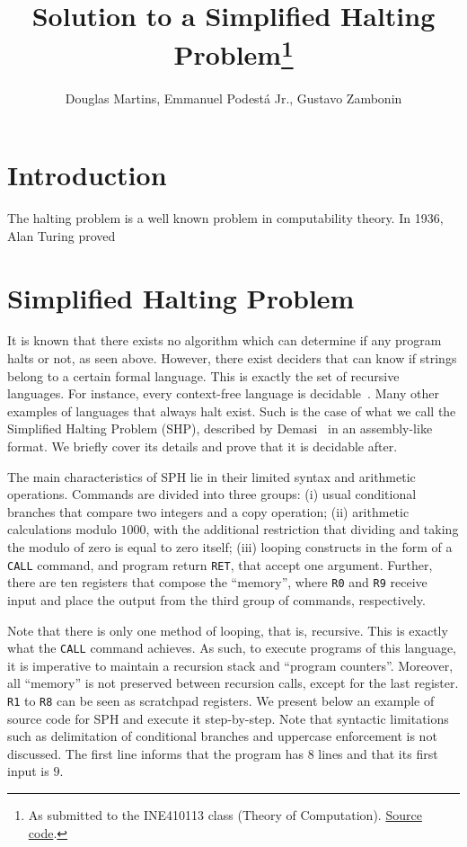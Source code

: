 \documentclass[12pt]{article}
\title{Solution to a Simplified Halting Problem\footnote{
    As submitted to the INE410113 class (Theory of Computation). \href{https://github.com/zambonin/ine410113}{Source code}.}}
\author{Douglas Martins\inst{1}, Emmanuel Podestá Jr.\inst{1}, Gustavo Zambonin\inst{1}}
\begin{document}
 

\maketitle

\section{Introduction}\label{sec:intro}

The halting problem is a well known problem in computability theory. In 1936, Alan Turing proved 

\section{Simplified Halting Problem}\label{sec:halting}

It is known that there exists no algorithm which can determine if any program halts or not, as seen above. However, there exist deciders that can know if strings belong to a certain formal language. This is exactly the set of recursive languages. For instance, every context-free language is decidable~\cite[Theorem 4.9]{Sipser:book:2012}. Many other examples of languages that always halt exist. Such is the case of what we call the Simplified Halting Problem (SHP), described by Demasi~\cite{Demasi:misc:2013:may} in an assembly-like format. We briefly cover its details and prove that it is decidable after.

The main characteristics of SPH lie in their limited syntax and arithmetic operations. Commands are divided into three groups: (i) usual conditional branches that compare two integers and a copy operation; (ii) arithmetic calculations modulo $1000$, with the additional restriction that dividing and taking the modulo of zero is equal to zero itself; (iii) looping constructs in the form of a \texttt{CALL} command, and program return \texttt{RET}, that accept one argument. Further, there are ten registers that compose the ``memory'', where \texttt{R0} and \texttt{R9} receive input and place the output from the third group of commands, respectively.

Note that there is only one method of looping, that is, recursive. This is exactly what the \texttt{CALL} command achieves. As such, to execute programs of this language, it is imperative to maintain a recursion stack and ``program counters''. Moreover, all ``memory'' is not preserved between recursion calls, except for the last register. \texttt{R1} to \texttt{R8} can be seen as scratchpad registers. We present below an example of source code for SPH and execute it step-by-step. Note that syntactic limitations such as delimitation of conditional branches and uppercase enforcement is not discussed. The first line informs that the program has $8$ lines and that its first input is $9$.
\end{document}
